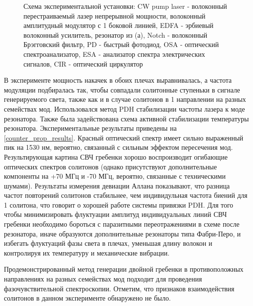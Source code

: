 \begin{figure}[ht]
\begin{minipage}[ht]{1\linewidth}
\end{minipage}
\caption{Схема экспериментальной установки: CW pump laser - волоконный перестраиваемый лазер непрерывной мощности, волоконный амплитудный модулятор с 1 боковой линией, EDFA - эрбиевый волоконный усилитель, резонатор из (а), Notch - волоконный Брэгговский фильтр, PD - быстрый фотодиод, OSA - оптический спектроанализатор, ESA - анализатор спектра электрических сигналов, CIR - оптический циркулятор}
\label{Setup_CounterProp}
\end{figure}

В эксперименте мощность накачек в обоих плечах выравнивалась, а частота модуляции подбиралась так, чтобы совпадали солитонные ступеньки в сигнале генерируемого света, также как и в случае солитонов в 1 направлении на разных семействах мод. Использовался метод PDH стабилизации частоты лазера к моде резонатора. Также была задействована схема активной стабилизации температуры резонатора. Экспериментальные результаты приведены на \ref{counter_prop_results}. Красный оптический спектр имеет сильно выраженный пик на 1530 нм, вероятно, связанный с сильным эффектом пересечения мод. Результирующая картина СВЧ гребенки хорошо воспроизводит огибающие оптических спектров солитонов (однако присутствуют дополнительные компоненты на +70 МГц и -70 МГц, вероятно, связанные с техническими шумами). Результаты измерения девиации Аллана показывают, что разница частот повторений солитонов стабильнее, чем индивидульная частота биений для 1 солитона, что говорит о хорошей работе системы привязки PDH. Для того чтобы минимизировать флуктуации амплитуд индивидуальных линий СВЧ гребенки необходимо бороться с паразитными переотражениями в схеме после резонатора, иначе образуются дополнительные резонаторы типа Фабри-Перо, и избегать флуктуаций фазы света в плечах, уменьшая длину волокон и контролируя их температуру и механические вибрации.

Продемонстрированный метод генерации двойной гребенки в противоположных направлениях на разных семействах мод подходит для проведения фазочувствительной спектроскопии. Отметим, что признаков взаимодействия солитонов в данном эксперименте обнаружено не было.

